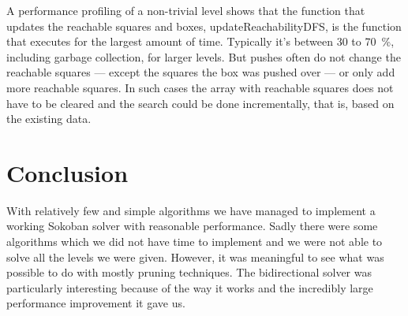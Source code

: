 \documentclass[a4paper,11pt]{article}
\renewcommand{\*}[0]{\cdot}
\begin{document}
A performance profiling of a non-trivial level shows that the function that
updates the reachable squares and boxes, updateReachabilityDFS, is the function
that executes for the largest amount of time. Typically it's between 30 to
70~\%, including garbage collection, for larger levels. But pushes often do not
change the reachable squares --- except the squares the box was pushed over ---
or only add more reachable squares. In such cases the array with reachable
squares does not have to be cleared and the search could be done incrementally,
that is, based on the existing data.


\part*{Conclusion}


With relatively few and simple algorithms we have managed to implement a
working Sokoban solver with reasonable performance. Sadly there were some
algorithms which we did not have time to implement and we were not able to
solve all the levels we were given. However, it was meaningful to see what was
possible to do with mostly pruning techniques. The bidirectional solver was
particularly interesting because of the way it works and the incredibly large
performance improvement it gave us.



 
\end{document}
